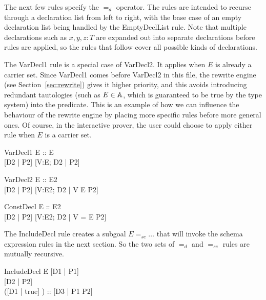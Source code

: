 \documentclass{entcs}
\newcommand{\sexprUnfoldsTo}{\mathrel{=_{se}}}
\newcommand{\declListUnfoldsTo}{\mathrel{=_d}}
\begin{document}
The next few rules specify the $\declListUnfoldsTo$ operator.
The rules are intended to recurse through a declaration list from left
to right, with the base case of an empty declaration list being handled
by the EmptyDeclList rule.  Note that multiple declarations such as
$x,y,z:T$ are expanded out into separate declarations before rules
are applied, so the rules that follow cover all possible kinds
of declarations.

The VarDecl1 rule is a special case of VarDecl2.  It applies when $E$ is
already a carrier set.  Since VarDecl1 comes before VarDecl2 in this file,
the rewrite engine (see Section~\ref{sec:rewrite}) gives it higher
priority, and this avoids introducing redundant tautologies (such as $E \in
{\mathbb A}$, which is guaranteed to be true by the type system) into the
predicate.  This is an example of how we can influence the behaviour of the
rewrite engine by placing more specific rules before more general ones.  Of
course, in the interactive prover, the user could choose to apply either
rule when $E$ is a carrier set.

\begin{zedrule}{VarDecl1}
   \proviso E :: \power E \\
   [D1 | true] \declListUnfoldsTo [D2 | P2]
\derives
   [V:E; D1 | true] \declListUnfoldsTo [V:E; D2 |  P2]
\end{zedrule}

\begin{zedrule}{VarDecl2}
   \proviso E :: \power E2 \\
   [D1 | true] \declListUnfoldsTo [D2 | P2]
\derives
   [V:E; D1 | true] \declListUnfoldsTo [V:E2; D2 |  V \in E \land P2]
\end{zedrule}

\begin{zedrule}{ConstDecl}
   \proviso E :: E2 \\
   [D1 | true] \declListUnfoldsTo [D2 | P2]
\derives
   [V==E; D1 | true] \declListUnfoldsTo [V:E2; D2 |  V = E \land P2]
\end{zedrule}

The IncludeDecl rule creates a subgoal $E \sexprUnfoldsTo \ldots$ that
will invoke the schema expression rules in the next section.  So the
two sets of $\declListUnfoldsTo$ and $\sexprUnfoldsTo$ rules are
mutually recursive.

\begin{zedrule}{IncludeDecl}
   E \sexprUnfoldsTo [D1 | P1] \\
   [D | true] \declListUnfoldsTo [D2 | P2] \\
   \proviso ([D1 | true] \land [D2 | true]) :: \power [D3 | true] 
\derives
   [E; D | true] \declListUnfoldsTo [D3 |  P1 \land P2]
\end{zedrule}
\end{document}
